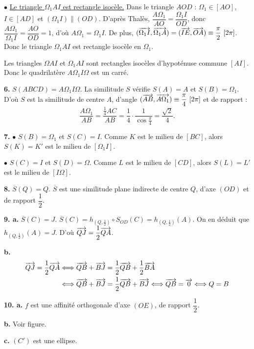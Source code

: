 \documentclass[11pt]{article}
\begin{document}
$\bullet$ \underline{Le triangle $\Omega_1 AI$ est rectangle isocèle.} Dans le triangle $AOD$ : $\Omega_1 \in [AO]$, $I \in [AD]$ et $(\Omega_1 I) \parallel (OD)$. D'après Thalès, $\dfrac{A\Omega_1}{AO} = \dfrac{\Omega_1 I}{OD}$, donc $\dfrac{A\Omega_1}{\Omega_1 I} = \dfrac{AO}{OD} = 1$, d'où $A\Omega_1 = \Omega_1 I$. De plus, $(\overrightarrow{\Omega_1 I}, \overrightarrow{\Omega_1 A}) = (\overrightarrow{IE}, \overrightarrow{OA}) \equiv \dfrac{\pi}{2}\ [2\pi]$. Donc le triangle $\Omega_1 AI$ est rectangle isocèle en $\Omega_1$.

Les triangles $\Omega AI$ et $\Omega_1 AI$ sont rectangles isocèles d'hypoténuse commune $[AI]$. Donc le quadrilatère $A\Omega_1 I\Omega$ est un carré.

\textbf{6.} $S(ABCD) = A\Omega_1 I\Omega$. La similitude $S$ vérifie $S(A) = A$ et $S(B) = \Omega_1$. D'où $S$ est la similitude de centre $A$, d'angle $(\overrightarrow{AB}, \overrightarrow{A\Omega_1}) \equiv \dfrac{\pi}{4}\ [2\pi]$ et de rapport :
\[ \frac{A\Omega_1}{AB} = \frac{\frac{1}{4}AC}{AB} = \frac{1}{4} \cdot \frac{1}{\cos\frac{\pi}{4}} = \frac{\sqrt{2}}{4}. \]

\textbf{7.} $\bullet$ $S(B) = \Omega_1$ et $S(C) = I$. Comme $K$ est le milieu de $[BC]$, alors $S(K) = K'$ est le milieu de $[\Omega_1 I]$.

$\bullet$ $S(C) = I$ et $S(D) = \Omega$. Comme $L$ est le milieu de $[CD]$, alors $S(L) = L'$ est le milieu de $[I\Omega]$.

\textbf{8.} $\overline{S}(Q) = Q$. $\overline{S}$ est une similitude plane indirecte de centre $Q$, d'axe $(OD)$ et de rapport $\dfrac{1}{2}$.

\textbf{9. a.} $\overline{S}(C) = J$. $\overline{S}(C) = h_{(Q,\frac{1}{2})} \circ S_{OD}(C) = h_{(Q,\frac{1}{2})}(A)$. On en déduit que $h_{(Q,\frac{1}{2})}(A) = J$. D'où $\overrightarrow{QJ} = \dfrac{1}{2}\overrightarrow{QA}$.

\textbf{b.}
\begin{align*}
\overrightarrow{QJ} = \frac{1}{2}\overrightarrow{QA} &\Longleftrightarrow \overrightarrow{QB} + \overrightarrow{BJ} = \frac{1}{2}\overrightarrow{QB} + \frac{1}{2}\overrightarrow{BA} \\
&\Longleftrightarrow \overrightarrow{QB} + \overrightarrow{BJ} = \frac{1}{2}\overrightarrow{QB} + \overrightarrow{BJ} \Longleftrightarrow \overrightarrow{QB} = \overrightarrow{0} \Longleftrightarrow Q = B
\end{align*}

\textbf{10. a.} $f$ est une affinité orthogonale d'axe $(OE)$, de rapport $\dfrac{1}{2}$.

\textbf{b.} Voir figure.

\textbf{c.} $(C')$ est une ellipse.
\end{document}
